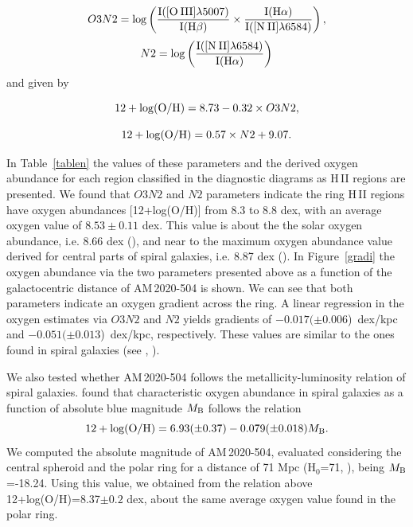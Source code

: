 \documentclass[useAMS,usenatbib]{mn2e}
\begin{document}
\begin{equation}
O3N2= \rm \log\left(\frac{I([O\:III]\lambda5007)}{I(H\beta)} \times
\frac{I(H\alpha)}{I([N\:II]\lambda6584)}\right),
\end{equation}
\begin{equation}
N2=\rm \log\left(\frac{I([N\:II]\lambda6584)}{I(H\alpha)}\right)
\end{equation}
and given by 

\begin{equation}
{\rm 12 + \log(O/H)} = 8.73 - 0.32 \times O3N2, 
\end{equation}

\begin{equation}
{\rm 12 + \log(O/H)} = 0.57\times N2+9.07.
\end{equation}


In Table~\ref{tablen} the values of these parameters and the derived oxygen
abundance for each region classified in the
diagnostic diagrams as H\,II regions are presented. We found that $O3N2$ 
and $N2$ parameters indicate  the ring H\,II regions have oxygen abundances 
[12+log(O/H)]
from 8.3 to 8.8 dex, with an  average oxygen value of $8.53\pm0.11$ dex. This
value is about the the solar oxygen abundance, i.e. 8.66 dex 
(\citealt{2004A&A...417..751A}), and near to  the maximum oxygen abundance value
derived for central parts of spiral galaxies, i.e. 8.87 dex
(\citealt{MNR:MNR11444}). 
In Figure~\ref{gradi} the oxygen abundance via the two parameters presented
above as a function of the  galactocentric distance of \mbox{AM\,2020-504} is
shown. We can see that both parameters indicate an  oxygen  gradient across the
ring.
A linear regression in the oxygen estimates via $O3N2$ and $N2$ yields gradients
of   \mbox{$-0.017(\pm0.006$) dex/kpc} and 
 \mbox{$-0.051(\pm0.013$) dex/kpc}, respectively. These values are similar to
the ones found in spiral galaxies (see \citealt{2005A&A...437..837D},
\citealt{2004A&A...425..849P}).



We also tested whether \mbox{AM\,2020-504} follows the 
metallicity-luminosity relation of spiral galaxies.  \cite{2004A&A...425..849P}
found that 
  characteristic oxygen abundance in spiral galaxies
as a function of absolute blue magnitude $M_{\rm B}$ follows the relation
\begin{equation}
12 + \log({\rm O/H}) = 6.93 (\pm 0.37)- 0.079 (\pm 0.018)M_{\rm B}.
\end{equation}
We computed the absolute magnitude of \mbox{AM\,2020-504}, evaluated
considering the central spheroid and the polar ring for a distance of 71 Mpc
(H$_0$=71, \citealt{2000ApJ...529..786M}), being
 $M_{\rm B}$=-18.24. Using this value, we obtained from the relation above 
12+log(O/H)=8.37$\pm0.2$ dex, about the same
 average oxygen value found in the polar ring.
\end{document}
